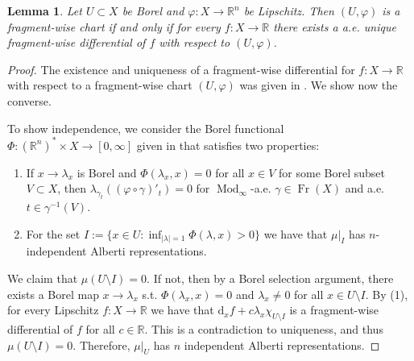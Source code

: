 \documentclass{amsart}
\newtheorem{lemma}[theorem]{Lemma}
\numberwithin{equation}{section}
\newcommand{\R}{\mathbb{R}}
\newcommand{\Mod}{\operatorname{Mod}}
\newcommand{\Fr}{\operatorname{Fr}}
\newcommand{\ud}{\mathrm {d}}
\begin{document}
\begin{lemma}\label{lem:chartchar} Let $U\subset X$ be Borel and $\varphi:X\to \R^n$ be Lipschitz. Then $(U,\varphi)$ is a fragment-wise chart if and only if for every $f:X\to \R$ there exists a a.e. unique fragment-wise differential of $f$ with respect to $(U,\varphi)$.
\end{lemma}
\begin{proof}
    The existence and uniqueness of a fragment-wise differential for $f:X\to \R$ with respect to a fragment-wise chart $(U,\varphi)$ was given in \cite[Theorem 1.2]{tsd24}. We show now the converse. 

    To show independence, we consider the Borel functional $\Phi:(\R^n)^*\times X\to [0,\infty]$ given in \cite[Proposition 4.5, Proposition 4.6, Proposition 5.2]{tsd24} that satisfies two properties:
    \begin{enumerate}
        \item If $x\to \lambda_x$ is Borel and $\Phi(\lambda_x, x)=0$ for all $x\in V$ for some Borel subset $V\subset X$, then $\lambda_{\gamma_t}((\varphi \circ \gamma)'_t)=0$ for $\Mod_\infty$-a.e. $\gamma\in \Fr(X)$ and a.e. $t\in \gamma^{-1}(V)$.
        \item For the set $I:=\{x\in U: \inf_{|\lambda|=1} \Phi(\lambda,x)>0\}$ we have that $\mu|_I$ has $n$-independent Alberti representations. 
    \end{enumerate}

    We claim that $\mu(U\setminus I)=0$. If not, then by a Borel selection argument, there exists a Borel map $x\to \lambda_x$ s.t. $\Phi(\lambda_x, x)=0$ and $\lambda_x\neq 0$ for all $x\in U\setminus I$. By (1), for every Lipschitz $f:X\to \R$ we have that  $\ud_x f + c\lambda_x \chi_{U\setminus I}$ is a fragment-wise differential of $f$ for all $c\in \R$. This is a contradiction to uniqueness, and thus $\mu(U\setminus I)=0.$ Therefore, $\mu|_U$ has $n$ independent Alberti representations.


\end{proof}
\end{document}
